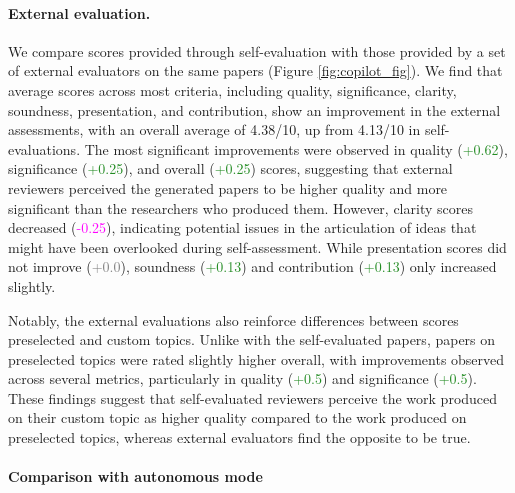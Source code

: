 \documentclass[11pt, a4paper]{gdm_format}
\begin{document}

\paragraph{External evaluation.} We compare scores provided through self-evaluation with those provided by a set of external evaluators on the same papers (Figure \ref{fig:copilot_fig}). We find that average scores across most criteria, including quality, significance, clarity, soundness, presentation, and contribution, show an improvement in the external assessments, with an overall average of 4.38/10, up from 4.13/10 in self-evaluations. The most significant improvements were observed in quality (\textcolor{ForestGreen}{+0.62}), significance (\textcolor{ForestGreen}{+0.25}), and overall (\textcolor{ForestGreen}{+0.25}) scores, suggesting that external reviewers perceived the generated papers to be higher quality and more significant than the researchers who produced them. However, clarity scores decreased (\textcolor{Magenta}{-0.25}), indicating potential issues in the articulation of ideas that might have been overlooked during self-assessment. While presentation scores did not improve (\textcolor{Gray}{+0.0}), soundness (\textcolor{ForestGreen}{+0.13}) and contribution (\textcolor{ForestGreen}{+0.13}) only increased slightly.

Notably, the external evaluations also reinforce differences between scores preselected and custom topics. Unlike with the self-evaluated papers, papers on preselected topics were rated slightly higher overall, with improvements observed across several metrics, particularly in quality (\textcolor{ForestGreen}{+0.5}) and significance (\textcolor{ForestGreen}{+0.5}). 
These findings suggest that self-evaluated reviewers perceive the work produced on their custom topic as higher quality compared to the work produced on preselected topics, whereas external evaluators find the opposite to be true. 

\paragraph{Comparison with autonomous mode}
\end{document}

